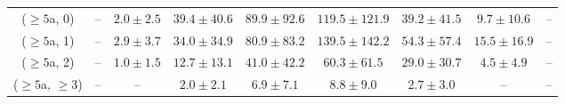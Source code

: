 \begin{table}[h!]
{\begin{tabular}{ccccccccc}
	($\ge5$a, 0) & -- & $2.0\pm 2.5$ & $39.4\pm 40.6$ & $89.9\pm 92.6$ & $119.5\pm 121.9$ & $39.2\pm 41.5$ & $9.7\pm 10.6$ & -- \\[0.5ex] 
	($\ge5$a, 1) & -- & $2.9\pm 3.7$ & $34.0\pm 34.9$ & $80.9\pm 83.2$ & $139.5\pm 142.2$ & $54.3\pm 57.4$ & $15.5\pm 16.9$ & -- \\[0.5ex] 
	($\ge5$a, 2) & -- & $1.0\pm 1.5$ & $12.7\pm 13.1$ & $41.0\pm 42.2$ & $60.3\pm 61.5$ & $29.0\pm 30.7$ & $4.5\pm 4.9$ & -- \\[0.5ex] 
	($\ge5$a, $\ge3$) & -- & -- & $2.0\pm 2.1$ & $6.9\pm 7.1$ & $8.8\pm 9.0$ & $2.7\pm 3.0$ & -- & -- \\[0.5ex] 
	\hline
	\hline
\end{tabular}}
\end{table}
